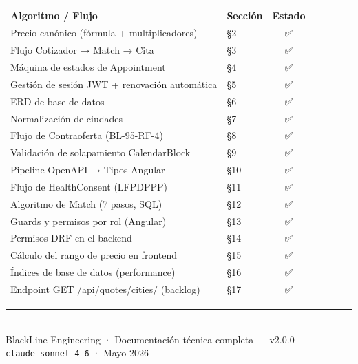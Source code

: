 \documentclass[11pt,a4paper]{article}
\begin{document}
\begin{center}
\begin{tabularx}{\textwidth}{Xlc}
\toprule
\rowcolor{blkMid}
\textcolor{blkGold}{\textbf{Algoritmo / Flujo}} &
\textcolor{blkGold}{\textbf{Sección}} &
\textcolor{blkGold}{\textbf{Estado}}\\
\midrule
Precio canónico (fórmula + multiplicadores)     & §2  & \textcolor{blkGreen}{✅}\\
\rowcolor{blkMid}
Flujo Cotizador → Match → Cita                  & §3  & \textcolor{blkGreen}{✅}\\
Máquina de estados de Appointment               & §4  & \textcolor{blkGreen}{✅}\\
\rowcolor{blkMid}
Gestión de sesión JWT + renovación automática   & §5  & \textcolor{blkGreen}{✅}\\
ERD de base de datos                            & §6  & \textcolor{blkGreen}{✅}\\
\rowcolor{blkMid}
Normalización de ciudades                       & §7  & \textcolor{blkGreen}{✅}\\
Flujo de Contraoferta (BL-95-RF-4)              & §8  & \textcolor{blkGreen}{✅}\\
\rowcolor{blkMid}
Validación de solapamiento CalendarBlock        & §9  & \textcolor{blkGreen}{✅}\\
Pipeline OpenAPI → Tipos Angular                & §10 & \textcolor{blkGreen}{✅}\\
\rowcolor{blkMid}
Flujo de HealthConsent (LFPDPPP)                & §11 & \textcolor{blkGreen}{✅}\\
Algoritmo de Match (7 pasos, SQL)               & §12 & \textcolor{blkGreen}{✅}\\
\rowcolor{blkMid}
Guards y permisos por rol (Angular)             & §13 & \textcolor{blkGreen}{✅}\\
Permisos DRF en el backend                      & §14 & \textcolor{blkGreen}{✅}\\
\rowcolor{blkMid}
Cálculo del rango de precio en frontend         & §15 & \textcolor{blkGreen}{✅}\\
Índices de base de datos (performance)          & §16 & \textcolor{blkGreen}{✅}\\
\rowcolor{blkMid}
Endpoint GET /api/quotes/cities/ (backlog)      & §17 & \textcolor{blkGreen}{✅}\\
\bottomrule
\end{tabularx}
\end{center}

\vspace{1.5cm}
\begin{center}
\textcolor{blkGold}{\rule{0.4\textwidth}{0.6pt}}\\[0.6cm]
{\small\color{blkText!50}
  BlackLine Engineering · Documentación técnica completa — v2.0.0\\
  \texttt{claude-sonnet-4-6} · Mayo 2026
}
\end{center}
\end{document}
